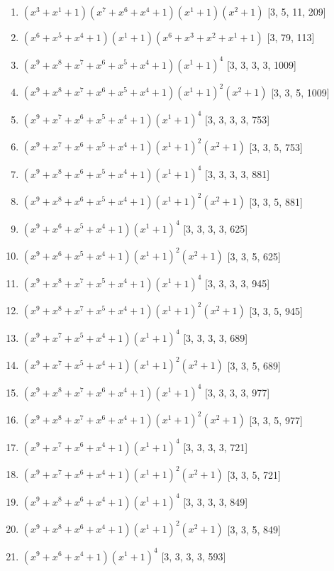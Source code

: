 \documentclass[10pt,twocolumn]{article}
\begin{document}
\begin{enumerate}
\item $(x^{3} + x^{1} + 1)(x^{7} + x^{6} + x^{4} + 1)(x^{1} + 1)(x^{2} + 1)$  [3, 5, 11, 209]
\item $(x^{6} + x^{5} + x^{4} + 1)(x^{1} + 1)(x^{6} + x^{3} + x^{2} + x^{1} + 1)$  [3, 79, 113]
\item $(x^{9} + x^{8} + x^{7} + x^{6} + x^{5} + x^{4} + 1)(x^{1} + 1)^{4}$  [3, 3, 3, 3, 1009]
\item $(x^{9} + x^{8} + x^{7} + x^{6} + x^{5} + x^{4} + 1)(x^{1} + 1)^{2}(x^{2} + 1)$  [3, 3, 5, 1009]
\item $(x^{9} + x^{7} + x^{6} + x^{5} + x^{4} + 1)(x^{1} + 1)^{4}$  [3, 3, 3, 3, 753]
\item $(x^{9} + x^{7} + x^{6} + x^{5} + x^{4} + 1)(x^{1} + 1)^{2}(x^{2} + 1)$  [3, 3, 5, 753]
\item $(x^{9} + x^{8} + x^{6} + x^{5} + x^{4} + 1)(x^{1} + 1)^{4}$  [3, 3, 3, 3, 881]
\item $(x^{9} + x^{8} + x^{6} + x^{5} + x^{4} + 1)(x^{1} + 1)^{2}(x^{2} + 1)$  [3, 3, 5, 881]
\item $(x^{9} + x^{6} + x^{5} + x^{4} + 1)(x^{1} + 1)^{4}$  [3, 3, 3, 3, 625]
\item $(x^{9} + x^{6} + x^{5} + x^{4} + 1)(x^{1} + 1)^{2}(x^{2} + 1)$  [3, 3, 5, 625]
\item $(x^{9} + x^{8} + x^{7} + x^{5} + x^{4} + 1)(x^{1} + 1)^{4}$  [3, 3, 3, 3, 945]
\item $(x^{9} + x^{8} + x^{7} + x^{5} + x^{4} + 1)(x^{1} + 1)^{2}(x^{2} + 1)$  [3, 3, 5, 945]
\item $(x^{9} + x^{7} + x^{5} + x^{4} + 1)(x^{1} + 1)^{4}$  [3, 3, 3, 3, 689]
\item $(x^{9} + x^{7} + x^{5} + x^{4} + 1)(x^{1} + 1)^{2}(x^{2} + 1)$  [3, 3, 5, 689]
\item $(x^{9} + x^{8} + x^{7} + x^{6} + x^{4} + 1)(x^{1} + 1)^{4}$  [3, 3, 3, 3, 977]
\item $(x^{9} + x^{8} + x^{7} + x^{6} + x^{4} + 1)(x^{1} + 1)^{2}(x^{2} + 1)$  [3, 3, 5, 977]
\item $(x^{9} + x^{7} + x^{6} + x^{4} + 1)(x^{1} + 1)^{4}$  [3, 3, 3, 3, 721]
\item $(x^{9} + x^{7} + x^{6} + x^{4} + 1)(x^{1} + 1)^{2}(x^{2} + 1)$  [3, 3, 5, 721]
\item $(x^{9} + x^{8} + x^{6} + x^{4} + 1)(x^{1} + 1)^{4}$  [3, 3, 3, 3, 849]
\item $(x^{9} + x^{8} + x^{6} + x^{4} + 1)(x^{1} + 1)^{2}(x^{2} + 1)$  [3, 3, 5, 849]
\item $(x^{9} + x^{6} + x^{4} + 1)(x^{1} + 1)^{4}$  [3, 3, 3, 3, 593]

\end{enumerate}
\end{document}
